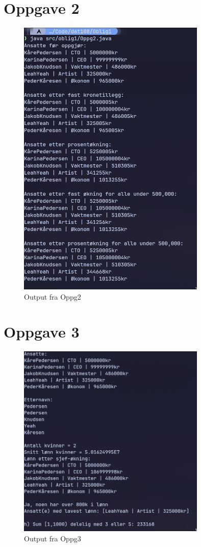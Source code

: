 \section{Oppgave 2}
\begin{figure}[H]   %
    \centering
    \includegraphics[width=0.8\textwidth]{./bilder/Oppg2.png}
    \caption{Output fra Oppg2}
\end{figure}

\newpage 
\section{Oppgave 3}
\begin{figure}[H]   %
    \centering
    \includegraphics[width=0.8\textwidth]{./bilder/Oppg3.png}
    \caption{Output fra Oppg3}
\end{figure}



